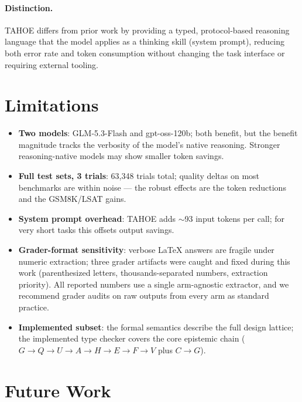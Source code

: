 \documentclass[11pt,a4paper]{article}
\begin{document}
\paragraph{Distinction.}
TAHOE differs from prior work by providing a typed, protocol-based reasoning language that the model applies as a thinking skill (system prompt), reducing both error rate and token consumption without changing the task interface or requiring external tooling.

\section{Limitations}
\label{sec:limitations}

\begin{itemize}[nosep,leftmargin=*]
    \item \textbf{Two models}: GLM-5.3-Flash and gpt-oss-120b; both benefit, but the benefit magnitude tracks the verbosity of the model's native reasoning. Stronger reasoning-native models may show smaller token savings.
    \item \textbf{Full test sets, 3 trials}: 63{,}348 trials total; quality deltas on most benchmarks are within noise --- the robust effects are the token reductions and the GSM8K/LSAT gains.
    \item \textbf{System prompt overhead}: TAHOE adds $\sim$93 input tokens per call; for very short tasks this offsets output savings.
    \item \textbf{Grader-format sensitivity}: verbose LaTeX answers are fragile under numeric extraction; three grader artifacts were caught and fixed during this work (parenthesized letters, thousands-separated numbers, extraction priority). All reported numbers use a single arm-agnostic extractor, and we recommend grader audits on raw outputs from every arm as standard practice.
    \item \textbf{Implemented subset}: the formal semantics describe the full design lattice; the implemented type checker covers the core epistemic chain ($G \to Q \to U \to A \to H \to E \to F \to V$ plus $C \to G$).
\end{itemize}

\section{Future Work}
\label{sec:future}
\end{document}
